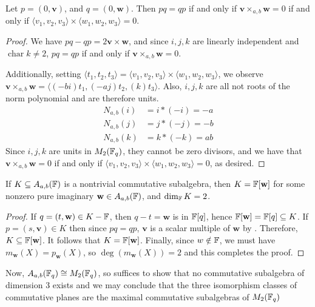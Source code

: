 \documentclass{amsart}
\begin{document}
\begin{lemma}\label{anticommutativity}
    Let $p = (0, \mathbf{v})$, and $q = (0, \mathbf{w})$. Then $pq = qp$ if and only if $\mathbf{v} \times_{a,b} \mathbf{w} = 0$ if and only if $\langle v_1, v_2, v_3 \rangle \times \langle w_1, w_2, w_3 \rangle = 0$.
\end{lemma}
\begin{proof}
    We have $pq - qp = 2 \mathbf{v} \times \mathbf{w}$, and since $i, j, k$ are linearly independent and $\operatorname{char} k \neq 2$, $pq = qp$ if and only if $\mathbf{v} \times_{a,b} \mathbf{w} = 0$.

    Additionally, setting $\langle t_1, t_2, t_3 \rangle = \langle v_1, v_2, v_3 \rangle \times \langle w_1, w_2, w_3 \rangle$, we observe $\mathbf{v} \times_{a,b} \mathbf{w} = \langle (-bi)t_1, (-aj) t_2, (k) t_3 \rangle$. Also, $i, j, k$ are all not roots of the norm polynomial and are therefore units. 
    \begin{align*}
        N_{a,b}(i) &= i * (-i) = -a \\
        N_{a,b}(j) &= j * (-j) = -b \\
        N_{a,b}(k) &= k * (-k) = ab
    \end{align*}
    Since $i, j, k$ are units in $M_2(\protect\mathbb{F}_q)$, they cannot be zero divisors, and we have that $\mathbf{v} \times_{a,b} \mathbf{w} = 0$ if and only if $\langle v_1, v_2, v_3 \rangle \times \langle w_1, w_2, w_3 \rangle = 0$, as desired. 
\end{proof}

\begin{theorem}\label{commutative-subalgebras}
    If $K \subseteq A_{a,b}(\protect\mathbb{F})$ is a nontrivial commutative subalgebra, then $K = \protect\mathbb{F}[\mathbf{w}]$ for some nonzero pure imaginary $\mathbf{w} \in A_{a,b}(\protect\mathbb{F})$, and $\dim_{\protect\mathbb{F}} K = 2$.
\end{theorem}
\begin{proof}
    If $q = (t, \mathbf{w}) \in K - \protect\mathbb{F}$, then $q-t = \mathbf{w}$ is in $\protect\mathbb{F}[q]$, hence $\protect\mathbb{F}[\mathbf{w}] = \protect\mathbb{F}[q] \subseteq K$. If $p = (s, \mathbf{v}) \in K$ then since $pq = qp$, $\mathbf{v}$ is a scalar multiple of $\mathbf{w}$ by . Therefore, $K \subseteq \protect\mathbb{F}[\mathbf{w}]$. It follows that $K = \protect\mathbb{F}[\mathbf{w}]$. Finally, since $w \notin \protect\mathbb{F}$, we must have $m_{\mathbf{w}}(X) = p_{\mathbf{w}}(X)$, so $\deg(m_{\mathbf{w}}(X)) = 2$ and this completes the proof.
\end{proof}

Now, $A_{a,b}(\protect\mathbb{F}_q) \cong M_2(\protect\mathbb{F}_q)$, so  suffices to show that no commutative subalgebra of dimension 3 exists and we may conclude that the three isomorphism classes of commutative planes are the maximal commutative subalgebras of $M_2(\protect\mathbb{F}_q)$
\end{document}
